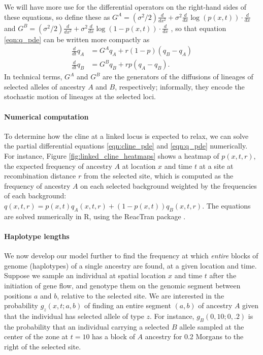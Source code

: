 \documentclass[11pt,letterpaper]{article}
\newcommand{\alisa}[1]{{\em \color{red} #1}}
\newcommand{\plr}[1]{{\em \color{blue} #1}}
\begin{document}
We will have more use for the differential operators on the right-hand sides of these equations,
so define these as
$
G^A = 
(\sigma^2/2) \frac{d}{dx^2}
+ 
\sigma^2 \frac{d}{dx} \log(p(x,t)) \cdot \frac{d}{dx} 
$
and
$
G^B = 
(\sigma^2/2) \frac{d}{dx^2}
+ 
\sigma^2 \frac{d}{dx} \log(1-p(x,t)) \cdot \frac{d}{dx} 
$
,
so that equation \eqref{eqn:q_pde} can be written more compactly as
\begin{align*}
    \frac{d}{dt} q_A &= G^A q_A + r (1-p) (q_B-q_A) \\
    \frac{d}{dt} q_B &= G^B q_B + r p (q_A-q_B) .
\end{align*}
In technical terms, $G^A$ and $G^B$ are the generators of the diffusions of lineages of selected alleles of ancestry $A$ and $B$, respectively;
informally, they encode the stochastic motion of lineages at the selected loci.


\paragraph{Numerical computation}
To determine how the cline at a linked locus is expected to relax, 
we can solve the partial differential equations \eqref{eqn:cline_pde} and \eqref{eqn:q_pde} numerically.
For instance, Figure \ref{fig:linked_cline_heatmaps} shows a heatmap of $p(x,t,r)$, 
the expected frequency of ancestry $A$ at location $x$ and time $t$ 
at a site at recombination distance $r$ from the selected site,
which is computed as the frequency of ancestry $A$ on each selected background weighted by the frequencies of each background:
$q(x,t,r) = p(x,t) q_A(x,t,r) + (1-p(x,t)) q_B(x,t,r)$. 
The equations are solved numerically in R, using the ReacTran package \citep{soetaert2012reactive}.

\paragraph{Haplotype lengths}
We now develop our model further to find the frequency at which \emph{entire} blocks of genome (haplotypes) 
of a single ancestry are found, at a given location and time.
Suppose we sample an individual at spatial location $x$ and time $t$ after the initiation of gene flow,
and genotype them on the genomic segment between positions $a$ and $b$, relative to the selected site. 
We are interested in the probability $g_z(x,t;a,b)$ 
of finding an entire segment $(a,b)$ of ancestry $A$ 
given that the individual has selected allele of type $z$.
For instance, $g_B(0,10;0,.2)$ is the probability that an individual carrying a selected $B$ allele sampled at the center of the zone
at $t=10$ has a block of $A$ ancestry for 0.2 Morgans to the right of the selected site.
\end{document}
